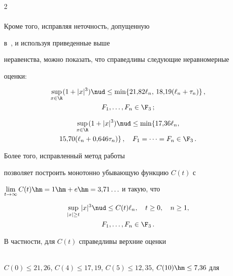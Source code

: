 \begin{multicols}{2}
\begin{multline*}
\end{multline*}



Кроме того, исправляя неточность, допущенную

в~\cite{NefedovaShevtsova2012}, и используя приведенные выше

неравенства, можно показать, что справедливы следующие неравномерные

оценки:

\begin{multline*}

\sup\limits_{x\in\R}(1+|x|^3)\nud\le \min\{21{,}82\ell_n,\,

18{,}19(\ell_n+\tau_n)\}\,,\\ F_1,\ldots,F_n\in\F_3\,;

\end{multline*}



\vspace*{-12pt}



\noindent

\begin{multline*}

\sup\limits_{x\in\R}(1+|x|^3)\nud\le \min\{ 17{,}36\ell_n,\\

15{,}70(\ell_n+0{,}646\tau_n)\}\,,\quad F_1=\cdots=F_n\in\F_3\,.

\end{multline*}

Более того, исправленный метод работы~\cite{NefedovaShevtsova2012}

позволяет построить монотонно убывающую функцию $C(t)$ с

$\lim\limits_{t\to\infty}C(t)\hm=1\hm+e\hm=3{,}71\ldots$ и такую, что

\begin{multline*}

\sup\limits_{|x|\ge t}|x|^3\nud\le C(t)\ell_n,\quad t\ge0,\quad n\ge1,\\

F_1,\ldots,F_n\in\F_3\,.

\end{multline*}

В частности, для $C(t)$ справедливы верхние оценки

\\

$C(0)\le21{,}26$, $C(4)\le17{,}19$, $C(5)\le12{,}35$, $C(10)\hm\le7{,}36$ для


\end{multicols}
